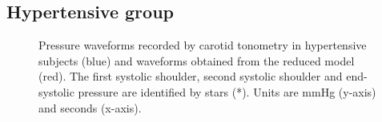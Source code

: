 \subsection{Hypertensive group}
\label{fig:app:IV_hyper}
\begin{figure}[h!]
\centering
{}
\end{figure}
\pagebreak
\begin{figure}[h!]
\centering
{}
\caption[Pressure waveforms recorded by carotid tonometry in hypertensive subjects and waveforms obtained from the reduced model]{Pressure waveforms recorded by carotid tonometry in hypertensive subjects (blue) and waveforms obtained from the reduced model (red). The first systolic shoulder, second systolic shoulder and end-systolic pressure are identified by stars (*). Units are mmHg (y-axis) and seconds (x-axis).}
\end{figure}

